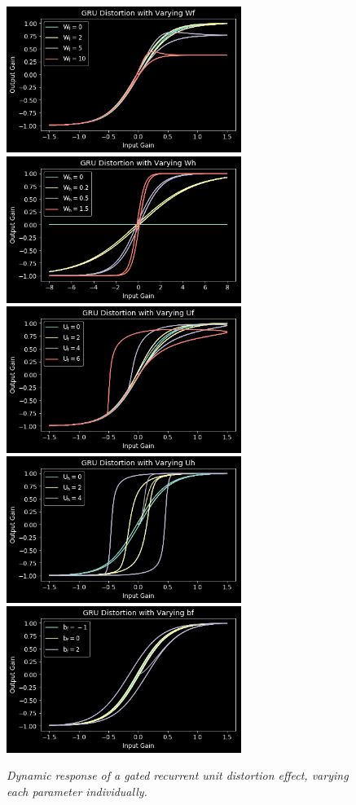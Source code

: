\documentclass[twoside,a4paper]{article}
\begin{document}
\begin{figure}[h]
    \center
    \includegraphics[width=3in]{../GatedRecurrentDistortion/Pics/wf.png}
    \includegraphics[width=3in]{../GatedRecurrentDistortion/Pics/wh.png}
    \includegraphics[width=3in]{../GatedRecurrentDistortion/Pics/uf.png}
    \includegraphics[width=3in]{../GatedRecurrentDistortion/Pics/uh.png}
    \includegraphics[width=3in]{../GatedRecurrentDistortion/Pics/bf.png}
    \caption{\label{gru-params}{\it Dynamic response of a gated recurrent unit
    distortion effect, varying each parameter individually.}}
\end{figure}
\end{document}
